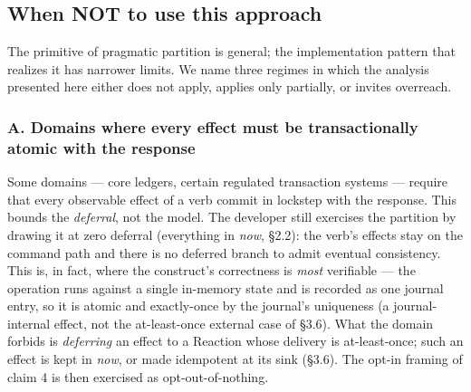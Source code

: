 \documentclass[
]{article}
\begin{document}
\subsection{When NOT to use this
approach}\label{when-not-to-use-this-approach}

The primitive of pragmatic partition is general; the implementation
pattern that realizes it has narrower limits. We name three regimes in
which the analysis presented here either does not apply, applies only
partially, or invites overreach.

\subsubsection{A. Domains where every effect must be transactionally
atomic with the
response}\label{a.-domains-where-every-effect-must-be-transactionally-atomic-with-the-response}

Some domains --- core ledgers, certain regulated transaction systems ---
require that every observable effect of a verb commit in lockstep with
the response. This bounds the \emph{deferral}, not the model. The
developer still exercises the partition by drawing it at zero deferral
(everything in \emph{now}, §2.2): the verb's effects stay on the command
path and there is no deferred branch to admit eventual consistency. This
is, in fact, where the construct's correctness is \emph{most} verifiable
--- the operation runs against a single in-memory state and is recorded
as one journal entry, so it is atomic and exactly-once by the journal's
uniqueness (a journal-internal effect, not the at-least-once external
case of §3.6). What the domain forbids is \emph{deferring} an effect to
a Reaction whose delivery is at-least-once; such an effect is kept in
\emph{now}, or made idempotent at its sink (§3.6). The opt-in framing of
claim 4 is then exercised as opt-out-of-nothing.
\end{document}
